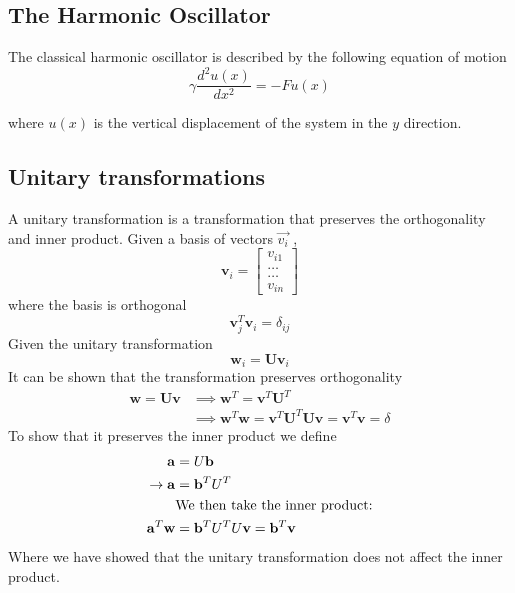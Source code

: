 \documentclass[%
reprint,
amsmath,amssymb,
aps,
]{revtex4-1}
\begin{document}
\subsection{The Harmonic Oscillator} \noindent 
The classical harmonic oscillator is described by the following equation of motion
\begin{equation*}
	\gamma \frac{d^2 u(x)}{dx^2} = -F u(x)
\end{equation*}

where $u(x)$ is the vertical displacement of the system in the $y$ direction. 

\subsection{Unitary transformations} \noindent 
A unitary transformation is a transformation that preserves the orthogonality and inner product. Given a basis of vectors $\vec{v_i}$ ,
\begin{equation*}
	\mathbf{v}_i = \begin{bmatrix} v_{i1} \\ \dots \\ \dots \\v_{in} \end{bmatrix}
\end{equation*}
where the basis is orthogonal 
\begin{equation*}
	\mathbf{v}_j^T\mathbf{v}_i = \delta_{ij}
\end{equation*}
Given the unitary transformation 
\begin{equation*}
	\mathbf{w}_i=\mathbf{U}\mathbf{v}_i
\end{equation*}
It can be shown that the transformation preserves orthogonality
\begin{align*}
	\mathbf{w}=\mathbf{U}\mathbf{v} &\implies \mathbf{w}^T=\mathbf{v}^T\mathbf{U}^T \\ &\implies \mathbf{w}^T\mathbf{w} = \mathbf{v}^T\mathbf{U}^T\mathbf{U}\mathbf{v} = \mathbf{v}^T\mathbf{v} = \delta
\end{align*}
To show that it preserves the inner product we define 
\begin{align*}
	\mathbf{a} &= U\mathbf{b} \\
	\rightarrow \mathbf{a} &= \mathbf{b}^TU^T \\
	&\textnormal{We then take the inner product:} \\
	 \mathbf{a}^T\mathbf{w} &= \mathbf{b}^TU^TU\mathbf{v} = \mathbf{b}^T\mathbf{v}
\end{align*}
Where we have showed that the unitary transformation does not affect the inner product. 
\end{document}

